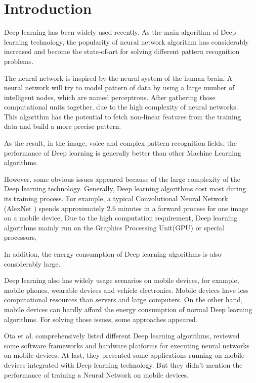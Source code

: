 \documentclass[article]{aaltoseries}
\begin{document}


\section{Introduction}


Deep learning has been widely used recently. As the main algorithm of Deep learning technology,
 the popularity of neural network algorithm 
 has considerably increased and become the state-of-art for solving different pattern recognition
problems.

The neural network is inspired by the neural system of the human brain. A neural network will 
try to model pattern of data by using a large number of intelligent nodes, which are named perceptrons. 
After gathering those computational units together, due to the high complexity of neural networks. 
This algorithm has the potential to fetch non-linear features from the training data 
and build a more precise pattern.

As the result, in the image, voice and complex pattern recognition fields, the performance of Deep learning
is generally better than other Machine Learning algorithms.  

However, some obvious issues appeared because of the large complexity of the Deep learning technology. 
Generally, Deep learning algorithms cost most during its training process. 
For example, a typical Convolutional Neural Network (AlexNet \cite{NIPS2012_4824}) 
spends approximately 2.6 minutes in a forward process for one image on a mobile device\cite{lane2015early}.
Due to the high computation requirement, Deep learning algorithms mainly run on the Graphics Processing Unit(GPU) or special processors, 

In addition, the energy consumption of Deep learning algorithms is also considerably large. %

Deep learning also has widely usage scenarios on mobile devices, for example, mobile phones, 
wearable devices and vehicle electronics. Mobile devices have less computational resources than 
servers and large computers. On the other hand, mobile devices can hardly afford the energy consumption
of normal Deep learning algorithms. For solving those issues, some approaches appeared.

Ota et al.\cite{Ota:2017} comprehensively listed different Deep learning algorithms,
reviewed some software frameworks and hardware platforms for executing neural networks on mobile devices.
At last, they presented some applications running on mobile devices integrated with Deep learning technology. 
But they didn't mention the performance of training a Neural Network on mobile devices. 
\end{document}
